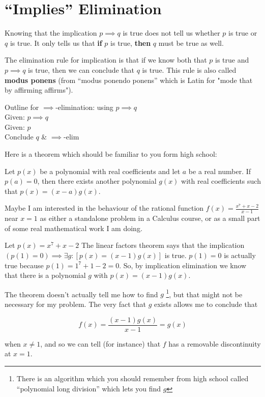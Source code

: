 \section{``Implies'' Elimination}

Knowing that the implication $p \implies q$ is true does not tell us whether $p$ is true or $q$ is true.  It only tells us that \textbf{if} $p$ is true, \textbf{then} $q$ must be true as well.

The elimination rule for implication is that if we know both that $p$ is true and $p \implies q$ is true, then we can conclude that $q$ is true.  This rule is also called \textbf{modus ponens} (from ``modus ponendo ponens'' which is Latin for "mode that by affirming affirms").

\begin{fitch*}
	\textrm{Outline for $\implies$-elimination:  using $p \implies q$}\\
	\hspace{1 cm}\textrm{Given: $p \implies q$}\\
	\hspace{1 cm}\textrm{Given: $p$}\\
	\hspace{1 cm}\textrm{Conclude $q$} & $\implies$-elim
	\end{fitch*}

\begin{example}
	Here is a theorem which should be familiar to you form high school:
	
	\begin{theorem}
		Let $p(x)$ be a polynomial with real coefficients and let $a$ be a real number.  If $p(a) = 0$, then there exists another polynomial $g(x)$ with real coefficients such that $p(x) = (x-a)g(x)$. 
	\end{theorem}
	
	Maybe I am interested in the behaviour of the rational function $f(x) = \frac{x^7+x-2}{x-1}$ near $x=1$ as either a standalone problem in a Calculus course, or as a small part of some real mathematical work I am doing.
	
	Let $p(x) = x^7+x-2$ The linear factors theorem says that the implication $(p(1) = 0) \implies \exists g: [p(x) = (x-1)g(x)]$ is true.  $p(1) = 0$ is actually true because $p(1) = 1^7+1-2 = 0$.  So, by implication elimination we know that there is a polynomial $g$ with $p(x) = (x-1)g(x)$.
	
	The theorem doesn't actually tell me how to find $g$ \footnote{There is an algorithm which you should remember from high school called ``polynomial long division'' which lets you find $g$}, but that might not be necessary for my problem.  The very fact that $g$ exists allows me to conclude that
	
	$$f(x) = \frac{(x-1)g(x)}{x-1} = g(x)$$
	
	when $x \neq 1$, and so we can tell (for instance) that $f$ has a removable discontinuity at $x=1$.
	
\end{example}

